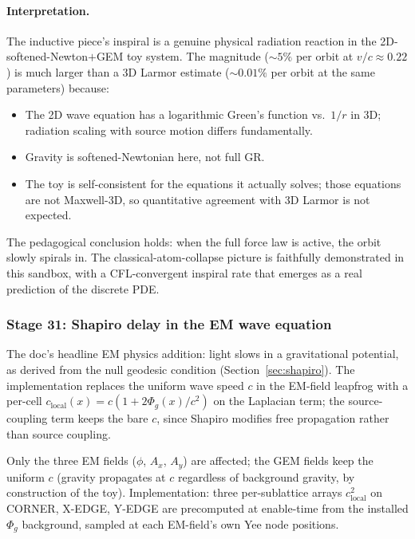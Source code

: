 \documentclass[11pt,a4paper]{article}
\newcommand{\Phig}{\Phi_g}
\begin{document}
\paragraph{Interpretation.}  The inductive piece's inspiral is a
genuine physical radiation reaction in the 2D-softened-Newton$+$GEM
toy system.  The magnitude ($\sim 5\%$ per orbit at $v/c \approx 0.22$)
is much larger than a 3D Larmor estimate ($\sim 0.01\%$ per orbit at
the same parameters) because:
\begin{itemize}
  \item The 2D wave equation has a logarithmic Green's function vs.\
    $1/r$ in 3D; radiation scaling with source motion differs
    fundamentally.
  \item Gravity is softened-Newtonian here, not full GR.
  \item The toy is self-consistent for the equations it actually solves;
    those equations are not Maxwell-3D, so quantitative agreement with
    3D Larmor is not expected.
\end{itemize}

The pedagogical conclusion holds: when the full force law is active,
the orbit slowly spirals in.  The classical-atom-collapse picture is
faithfully demonstrated in this sandbox, with a CFL-convergent inspiral
rate that emerges as a real prediction of the discrete PDE.

\subsubsection{Stage 31: Shapiro delay in the EM wave equation}
\label{sec:stage_shapiro_delay}

The doc's headline EM physics addition: light slows in a gravitational
potential, as derived from the null geodesic condition
(Section~\ref{sec:shapiro}).  The implementation replaces the uniform
wave speed $c$ in the EM-field leapfrog with a per-cell
$c_{\mathrm{local}}(x) = c (1 + 2 \Phig(x) / c^2)$ on the Laplacian
term; the source-coupling term keeps the bare $c$, since Shapiro
modifies free propagation rather than source coupling.

Only the three EM fields ($\phi$, $A_x$, $A_y$) are affected; the GEM
fields keep the uniform $c$ (gravity propagates at $c$ regardless of
background gravity, by construction of the toy).  Implementation:
three per-sublattice arrays $c_{\mathrm{local}}^2$ on CORNER, X-EDGE,
Y-EDGE are precomputed at enable-time from the installed $\Phig$
background, sampled at each EM-field's own Yee node positions.
\end{document}
